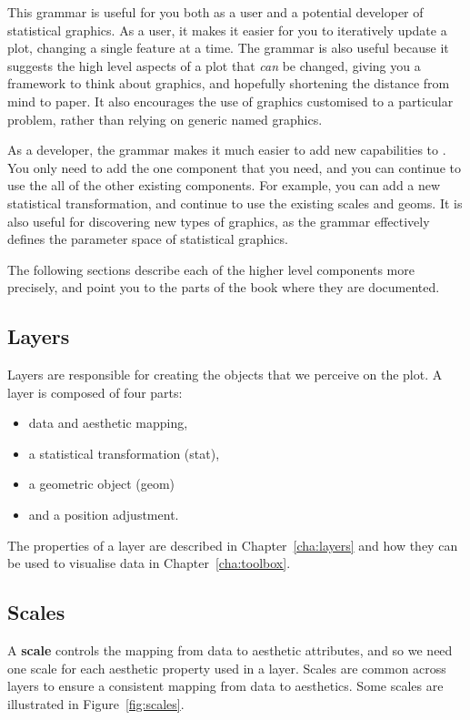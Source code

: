 This grammar is useful for you both as a user and a potential developer of statistical graphics.  As a user, it makes it easier for you to iteratively update a plot, changing a single feature at a time.  The grammar is also useful because it suggests the high level aspects of a plot that \emph{can} be changed, giving you a framework to think about graphics, and hopefully shortening the distance from mind to paper.  It also encourages the use of graphics customised to a particular problem, rather than relying on generic named graphics.

As a developer, the grammar makes it much easier to add new capabilities to \ggplot. You only need to add the one component that you need, and you can continue to use the all of the other existing components.  For example, you can add a new statistical transformation, and continue to use the existing scales and geoms.  It is also useful for discovering new types of graphics, as the grammar effectively defines the parameter space of statistical graphics.

The following sections describe each of the higher level components more precisely, and point you to the parts of the book where they are documented.

\subsection{Layers}

Layers are responsible for creating the objects that we perceive on the plot.  A layer is composed of four parts:  

\begin{itemize}
  \item data and aesthetic mapping,
  \item a statistical transformation (stat), 
  \item a geometric object (geom)
  \item and a position adjustment.
\end{itemize}

\noindent The properties of a layer are described in Chapter~\ref{cha:layers} and how they can be used to visualise data in Chapter~\ref{cha:toolbox}.

\subsection{Scales}\label{sec:scales}

A {\bf scale} controls the mapping from data to aesthetic attributes, and so we need one scale for each aesthetic property used in a layer.  Scales are common across layers to ensure a consistent mapping from data to aesthetics.  Some scales are illustrated in Figure~\ref{fig:scales}.

